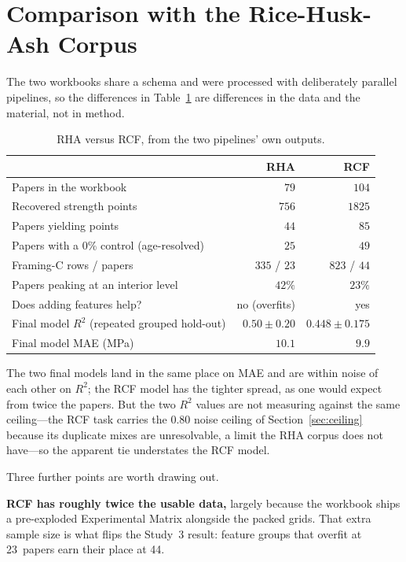 \documentclass[11pt]{article}
\newcommand{\R}{$R^2$}
\begin{document}
\section{Comparison with the Rice-Husk-Ash Corpus}
\label{sec:cmp}
The two workbooks share a schema and were processed with deliberately parallel
pipelines, so the differences in Table~\ref{tab:cmp} are differences in the data and
the material, not in method.

\begin{table}[H]\centering\small
\caption{RHA versus RCF, from the two pipelines' own outputs.}
\label{tab:cmp}
\begin{tabular}{lrr}
\toprule
 & RHA & RCF \\
\midrule
Papers in the workbook & $79$ & $104$ \\
Recovered strength points & $756$ & $1825$ \\
Papers yielding points & $44$ & $85$ \\
Papers with a 0\% control (age-resolved) & $25$ & $49$ \\
Framing-C rows / papers & $335$ / $23$ & $823$ / $44$ \\
Papers peaking at an interior level & $42\%$ & $23\%$ \\
Does adding features help? & no (overfits) & yes \\
Final model \R{} (repeated grouped hold-out) & $0.50\pm0.20$ & $0.448\pm0.175$ \\
Final model MAE (MPa) & $10.1$ & $9.9$ \\
\bottomrule
\end{tabular}
\end{table}

The two final models land in the same place on MAE and are within noise of each
other on \R{}; the RCF model has the tighter spread, as one would expect from twice
the papers. But the two \R{} values are not measuring against the same ceiling---the
RCF task carries the $0.80$ noise ceiling of Section~\ref{sec:ceiling} because its
duplicate mixes are unresolvable, a limit the RHA corpus does not have---so the
apparent tie understates the RCF model.

Three further points are worth drawing out.

\textbf{RCF has roughly twice the usable data,} largely because the workbook ships a
pre-exploded Experimental Matrix alongside the packed grids. That extra sample size
is what flips the Study~3 result: feature groups that overfit at 23~papers earn
their place at 44.
\end{document}
